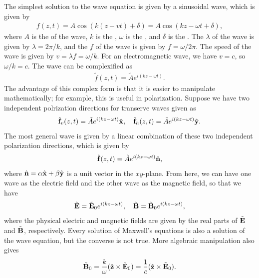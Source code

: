 The simplest solution to the wave equation is given by a sinusoidal wave, which is given by
\begin{align}
    f(z,t) = A \cos (k(z-vt) + \delta) = A \cos (kz - \omega t + \delta),
\end{align}
where $A$ is the  of the wave, $k$ is the , $\omega$ is the , and $\delta$ is the . The  $\lambda$ of the wave is given by $\lambda = 2\pi/k$, and the  $f$ of the wave is given by $f = \omega/2\pi$. The speed of the wave is given by $v = \lambda f = \omega/k$. For an electromagnetic wave, we have $v = c$, so $\omega/k = c$. The wave can be complexified as
\begin{align}
    \tilde{f}(z,t) = \tilde{A} e^{i(kz - \omega t)}.
\end{align}
The advantage of this complex form is that it is easier to manipulate mathematically; for example, this is useful in polarization. Suppose we have two independent polrization directions for transerve waves given as
\begin{align}
    \hat{\mathbf{f}}_{v}(z,t) = \tilde{A} e^{i(kz-\omega t)} \hat{\mathbf{x}}, \quad \hat{\mathbf{f}}_{h}(z,t) = \tilde{A} e^{i(kz-\omega t)} \hat{\mathbf{y}}.
\end{align}
The most general wave is given by a linear combination of these two independent polarization directions, which is given by
\begin{align}
    \hat{\mathbf{f}}(z,t) = \tilde{A} e^{i(kz-\omega t)} \hat{\mathbf{n}},
\end{align}
where $\hat{\mathbf{n}} = \alpha \hat{\mathbf{x}} + \beta \hat{\mathbf{y}}$ is a unit vector in the $xy$-plane. From here, we can have one wave as the electric field and the other wave as the magnetic field, so that we have
\begin{align}
    \tilde{\mathbf{E}} = \tilde{\mathbf{E}}_{0} e^{i(kz-\omega t)}, \quad \tilde{\mathbf{B}} = \tilde{\mathbf{B}}_{0} e^{i(kz-\omega t)},
\end{align}
where the physical electric and magnetic fields are given by the real parts of $\tilde{\mathbf{E}}$ and $\tilde{\mathbf{B}}$, respectively. Every solution of Maxwell's equations is also a solution of the wave equation, but the converse is not true. More algebraic manipulation also gives
\begin{align}
    \tilde{\mathbf{B}}_{0} = \frac{k}{\omega} (\hat{\mathbf{z}} \times \tilde{\mathbf{E}}_{0}) = \frac{1}{c} (\hat{\mathbf{z}} \times \tilde{\mathbf{E}}_{0}).
\end{align}